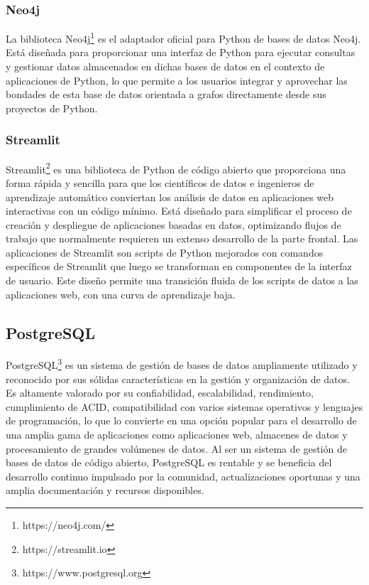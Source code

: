 \subsubsection{Neo4j}

La biblioteca Neo4j\footnote{https://neo4j.com/} es el adaptador oficial para Python de bases de datos Neo4j. Está 
diseñada para proporcionar una 
interfaz de Python para ejecutar 
consultas y gestionar datos almacenados en dichas bases de datos en el contexto de aplicaciones de Python, lo que permite 
a los usuarios integrar y aprovechar las bondades de esta base de datos orientada a grafos directamente desde sus 
proyectos de Python.

\subsubsection{Streamlit}

Streamlit\footnote{https://streamlit.io} es una biblioteca de Python de código abierto que proporciona una forma rápida y sencilla para que los 
científicos de datos e ingenieros de aprendizaje automático conviertan los análisis de datos en aplicaciones web 
interactivas con un código mínimo. Está diseñado para simplificar el proceso de creación y despliegue de aplicaciones 
basadas en datos, optimizando flujos de trabajo que normalmente requieren un extenso desarrollo de la parte frontal. 
Las aplicaciones de Streamlit son scripts de Python mejorados con comandos específicos de Streamlit que luego se 
transforman en componentes de la interfaz de usuario. Este diseño 
permite una transición fluida de los scripts de datos a las aplicaciones web, con una curva de aprendizaje baja.


\subsection{PostgreSQL}

PostgreSQL\footnote{https://www.postgresql.org} es un sistema de gestión de bases de datos ampliamente utilizado y 
reconocido por sus sólidas 
características en la gestión y organización de datos. Es altamente valorado por su confiabilidad, escalabilidad, 
rendimiento, cumplimiento de ACID, compatibilidad con varios sistemas operativos y lenguajes de programación, lo que 
lo convierte en una opción popular para el desarrollo de una amplia gama de aplicaciones 
como aplicaciones web, 
almacenes de datos y procesamiento de grandes volúmenes de datos. 
Al ser un sistema de gestión de bases de datos de código abierto, PostgreSQL es rentable y se beneficia del 
desarrollo continuo impulsado por la comunidad, actualizaciones oportunas y una amplia documentación y recursos 
disponibles.

